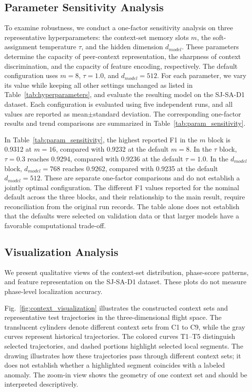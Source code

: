 \documentclass[iicol,pdflatex,sn-basic,Numbered]{sn-jnl}%
\theoremstyle{thmstyleone}%
\theoremstyle{thmstyletwo}%
\theoremstyle{thmstylethree}%
\begin{document}
\subsection{Parameter Sensitivity Analysis}

To examine robustness, we conduct a one-factor sensitivity analysis on three representative hyperparameters: the context-set memory slots $m$, the soft-assignment temperature $\tau$, and the hidden dimension $d_{model}$.
These parameters determine the capacity of peer-context representation, the sharpness of context discrimination, and the capacity of feature encoding, respectively.
The default configuration uses $m=8$, $\tau=1.0$, and $d_{model}=512$.
For each parameter, we vary its value while keeping all other settings unchanged as listed in Table~\ref{tab:hyperparameters}, and evaluate the resulting model on the SJ-SA-D1 dataset.
Each configuration is evaluated using five independent runs, and all values are reported as mean$\pm$standard deviation.
The corresponding one-factor results and trend comparisons are summarized in Table~\ref{tab:param_sensitivity}.

In Table~\ref{tab:param_sensitivity}, the highest reported F1 in the $m$ block is 0.9312 at $m=16$, compared with 0.9232 at the default $m=8$. In the $\tau$ block, $\tau=0.3$ reaches 0.9294, compared with 0.9236 at the default $\tau=1.0$. In the $d_{model}$ block, $d_{model}=768$ reaches 0.9262, compared with 0.9235 at the default $d_{model}=512$.
These are separate one-factor comparisons and do not establish a jointly optimal configuration. The different F1 values reported for the nominal default across the three blocks, and their relationship to the main result, require reconciliation from the original run records. The table alone does not establish that the defaults were selected on validation data or that larger models have a favorable computational trade-off.

\subsection{Visualization Analysis}

We present qualitative views of the context-set distribution, phase-score patterns, and feature representation on the SJ-SA-D1 dataset. These plots do not measure phase-level localization accuracy.

Fig.~\ref{fig:context_visualization} illustrates the constructed context sets and representative test trajectories in the three-dimensional flight space. 
The translucent cylinders denote different context sets from C1 to C9, while the gray curves represent historical trajectories. 
The colored curves T1--T5 distinguish selected trajectories, and dashed portions highlight selected local segments. 
The drawing illustrates how these trajectories pass through different context sets; it does not establish whether a highlighted segment coincides with a labeled anomaly. 
The zoom-in view shows the geometry of one context set and should be interpreted descriptively.
\end{document}
